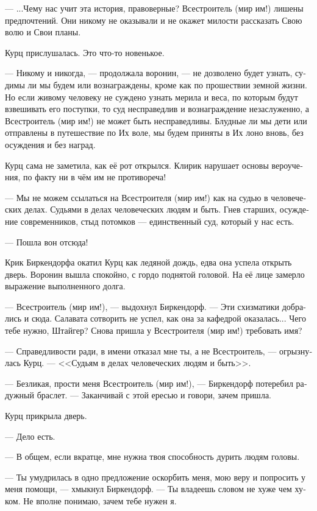 \documentclass[a4paper,12pt,fleqn]{book}\usepackage{cooltooltips}\usepackage{polyglossia}\setdefaultlanguage[babelshorthands=true]{russian}\setotherlanguage{english}\defaultfontfeatures{Ligatures=TeX,Mapping=tex-text} \usepackage{xcolor}\definecolor{lightgray}{HTML}{bbbbbb}\color{lightgray}\newcommand{\ml}[3]{\textenglish{\textcolor{black}{#3}}}
\newcommand{\asterism}{\vspace{1em}{\centering\Large\bfseries$\ast~\ast~\ast$\par}\vspace{1em}}
\begin{document}
--- ...Чему нас учит эта история, правоверные?
Всестроитель (мир им!) лишены предпочтений.
Они никому не оказывали и не окажет милости рассказать Свою волю и Свои планы.

Курц прислушалась.
Это что-то новенькое.

--- Никому и никогда, --- продолжала воронин, --- не дозволено будет узнать, судимы ли мы будем или вознаграждены, кроме как по прошествии земной жизни.
Но если живому человеку не суждено узнать мерила и веса, по которым будут взвешивать его поступки, то суд несправедлив и вознаграждение незаслуженно, а Всестроитель (мир им!) не может быть несправедливы.
Блудные ли мы дети или отправлены в путешествие по Их воле, мы будем приняты в Их лоно вновь, без осуждения и без наград.

Курц сама не заметила, как её рот открылся.
Клирик нарушает основы вероучения, по факту ни в чём им не противореча!

--- Мы не можем ссылаться на Всестроителя (мир им!) как на судью в человеческих делах.
Судьями в делах человеческих людям и быть.
Гнев старших, осуждение современников, стыд потомков --- единственный суд, который у нас есть.

\asterism

--- Пошла вон отсюда!

Крик Биркендорфа окатил Курц как ледяной дождь, едва она успела открыть дверь.
Воронин вышла спокойно, с гордо поднятой головой.
На её лице замерло выражение выполненного долга.

--- Всестроитель (мир им!), --- выдохнул Биркендорф.
--- Эти схизматики добрались и сюда.
Салавата сотворить не успел, как она за кафедрой оказалась...
Чего тебе нужно, Штайгер?
Снова пришла у Всестроителя (мир им!) требовать имя?

--- Справедливости ради, в имени отказал мне ты, а не Всестроитель, --- огрызнулась Курц.
--- <<Судьям в делах человеческих людям и быть>>.

--- Безликая, прости меня Всестроитель (мир им!), --- Биркендорф потеребил радужный браслет.
--- Заканчивай с этой ересью и говори, зачем пришла.

Курц прикрыла дверь.

--- Дело есть.

\asterism

--- В общем, если вкратце, мне нужна твоя способность дурить людям головы.

--- Ты умудрилась в одно предложение оскорбить меня, мою веру и попросить у меня помощи, --- хмыкнул Биркендорф.
--- Ты владеешь словом не хуже чем хуком.
Не вполне понимаю, зачем тебе нужен я.
\end{document}
